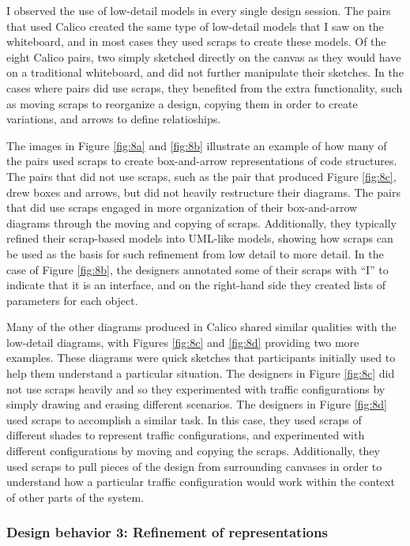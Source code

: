 \documentclass[12pt,fleqn]{ucithesis}
\begin{document}
I observed the use of low-detail models in every single design session. The pairs that used Calico created the same type of low-detail models that I saw on the whiteboard, and in most cases they used scraps to create these models. Of the eight Calico pairs, two simply sketched directly on the canvas as they would have on a traditional whiteboard, and did not further manipulate their sketches. In the cases where pairs did use scraps, they benefited from the extra functionality, such as moving scraps to reorganize a design, copying them in order to create variations, and arrows to define relatioships.

The images in Figure \ref{fig:8a} and \ref{fig:8b} illustrate an example of how many of the pairs used scraps to create box-and-arrow representations of code structures. The pairs that did not use scraps, such as the pair that produced Figure \ref{fig:8c}, drew boxes and arrows, but did not heavily restructure their diagrams. The pairs that did use scraps engaged in more organization of their box-and-arrow diagrams through the moving and copying of scraps. Additionally, they typically refined their scrap-based models into UML-like models, showing how scraps can be used as the basis for such refinement from low detail to more detail. In the case of Figure \ref{fig:8b}, the designers annotated some of their scraps with ``I'' to indicate that it is an interface, and on the right-hand side they created lists of parameters for each object.

Many of the other diagrams produced in Calico shared similar qualities with the low-detail diagrams, with Figures \ref{fig:8c} and \ref{fig:8d} providing two more examples. These diagrams were quick sketches that participants initially used to help them understand a particular situation. The designers in Figure \ref{fig:8c} did not use scraps heavily and so they experimented with traffic configurations by simply drawing and erasing different scenarios. The designers in Figure \ref{fig:8d} used scraps to accomplish a similar task. In this case, they used scraps of different shades to represent traffic configurations, and experimented with different configurations by moving and copying the scraps. Additionally, they used scraps to pull pieces of the design from surrounding canvases in order to understand how a particular traffic configuration would work within the context of other parts of the system. 



\subsubsection {Design behavior 3: Refinement of representations}
\label{results:24}
\end{document}
